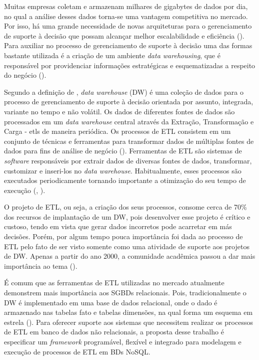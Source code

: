 Muitas empresas coletam e armazenam milhares de gigabytes de dados por dia, no qual a análise desses dados torna-se uma vantagem competitiva no mercado. Por isso, há uma grande necessidade de novas arquiteturas para o gerenciamento de suporte à decisão que possam alcançar melhor escalabilidade e eficiência (\cite{liu:2013}). Para auxiliar no processo de gerenciamento de suporte à decisão uma das formas bastante utilizada é a criação de um ambiente \textit{data warehousing}, que é responsável por providenciar informações estratégicas e esquematizadas a respeito do negócio (\cite{dayal:1997}).

Segundo a definição de \cite{kimball:2002}, \textit{data warehouse} (DW) é uma coleção de dados para o processo de gerenciamento de suporte à decisão orientada por assunto, integrada, variante no tempo e não volátil. Os dados de diferentes fontes de dados são processados em um \textit{data warehouse} central através da Extração, Transformação e Carga - \acp{etl} de maneira periódica. Os processos de ETL consistem em um conjunto de técnicas e ferramentas para transformar dados de múltiplas fontes de dados para fins de análise de negócio (\cite{silva:2016}). Ferramentas de ETL são sistemas de \textit{software} responsáveis por extrair dados de diversas fontes de dados, transformar, customizar e inseri-los no \textit{data warehouse}. Habitualmente, esses processos são executados periodicamente tornando importante a otimização do seu tempo de execução (\cite{vassiliadis:2005}, \cite{silva:2016}).

O projeto de ETL, ou seja, a criação dos seus processos, consome cerca de 70\% dos recursos de implantação de um DW, pois desenvolver esse projeto é crítico e custoso, tendo em vista que gerar dados incorretos pode acarretar em más decisões. Porém, por algum tempo pouca importância foi dada ao processo de ETL pelo fato de ser visto somente como uma atividade de suporte aos projetos de DW. Apenas a partir do ano 2000, a comunidade acadêmica passou a dar mais importância ao tema (\cite{silva:2012}).

É comum que as ferramentas de ETL utilizadas no mercado atualmente demonstrem mais importância aos SGBDs relacionais. Pois, tradicionalmente o DW é implementado em uma base de dados relacional, onde o dado é armazenado nas tabelas fato e tabelas dimensões, na qual forma um esquema em estrela (\cite{kimball:2002}). Para oferecer suporte aos sistemas que necessitem realizar os processos de ETL em banco de dados não relacionais, a proposta desse trabalho é especificar um \textit{framework} programável, flexível e integrado para modelagem e execução de processos de ETL em BDs NoSQL.

